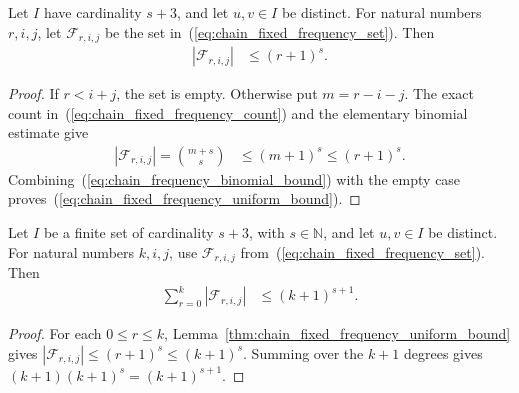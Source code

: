 \begin{lemma}
    \label{thm:chain_fixed_frequency_uniform_bound}
    \leanok
    Let $I$ have cardinality $s+3$, and let $u,v\in I$ be distinct.
    For natural numbers $r,i,j$, let $\mathcal F_{r,i,j}$ be the set
    in~(\ref{eq:chain_fixed_frequency_set}). Then
    \begin{align}
        |\mathcal F_{r,i,j}| & \le (r+1)^s.
        \label{eq:chain_fixed_frequency_uniform_bound}
    \end{align}
\end{lemma}

\begin{proof}\leanok
    If $r<i+j$, the set is empty. Otherwise put $m=r-i-j$.
    The exact count in~(\ref{eq:chain_fixed_frequency_count}) and the
    elementary binomial estimate give
    \begin{align}
        |\mathcal F_{r,i,j}|=\binom{m+s}{s}
         & \le (m+1)^s\le(r+1)^s.
        \label{eq:chain_frequency_binomial_bound}
    \end{align}
    Combining~(\ref{eq:chain_frequency_binomial_bound}) with the empty case
    proves~(\ref{eq:chain_fixed_frequency_uniform_bound}).
\end{proof}

\begin{lemma}
    \label{thm:chain_fixed_frequency_degree_sum}
    \leanok
    Let $I$ be a finite set of cardinality $s+3$, with $s\in\mathbb N$,
    and let $u,v\in I$ be distinct. For natural numbers $k,i,j$, use
    $\mathcal F_{r,i,j}$ from~(\ref{eq:chain_fixed_frequency_set}). Then
    \begin{align}
        \sum_{r=0}^{k}|\mathcal F_{r,i,j}|
         & \le (k+1)^{s+1}.
        \label{eq:chain_frequency_degree_sum}
    \end{align}
\end{lemma}

\begin{proof}\leanok
    For each $0\le r\le k$,
    Lemma~\ref{thm:chain_fixed_frequency_uniform_bound} gives
    $|\mathcal F_{r,i,j}|\le(r+1)^s\le(k+1)^s$.
    Summing over the $k+1$ degrees gives
    $(k+1)(k+1)^s=(k+1)^{s+1}$.
\end{proof}

